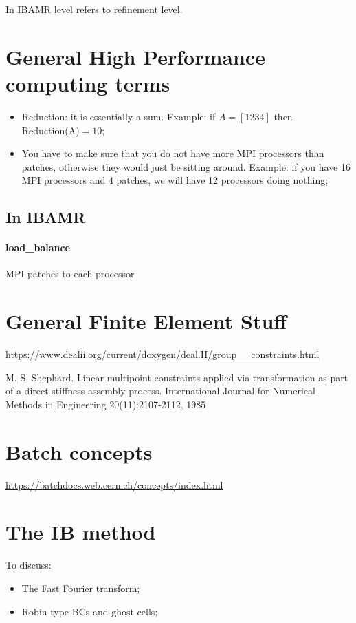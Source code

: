 \documentclass[12pt,a4paper,twoside]{article}
\begin{document}
\newpage 

In IBAMR level refers to refinement level.

\section{General High Performance computing terms}
\begin{itemize}
    \item Reduction: it is essentially a sum. Example: if $A=[1 2 3 4]$ then Reduction(A)$=10$;
    \item You have to make sure that you do not have more MPI processors than patches, otherwise they would just be sitting around. Example: if you have 16 MPI processors and 4 patches, we will have 12 processors doing nothing;
\end{itemize}

\subsection{In IBAMR}
\paragraph{load_balance}
MPI patches to each processor



\section{General Finite Element Stuff}

\url{https://www.dealii.org/current/doxygen/deal.II/group__constraints.html}

M. S. Shephard. Linear multipoint constraints applied via transformation as part of a direct stiffness assembly process. International Journal for Numerical Methods in Engineering 20(11):2107-2112, 1985


\section{Batch concepts} 
\url{https://batchdocs.web.cern.ch/concepts/index.html}


\section{The IB method}
To discuss:
\begin{itemize}
    \item The Fast Fourier transform; 
    \item Robin type BCs and ghost cells;
\end{itemize}
\end{document}
